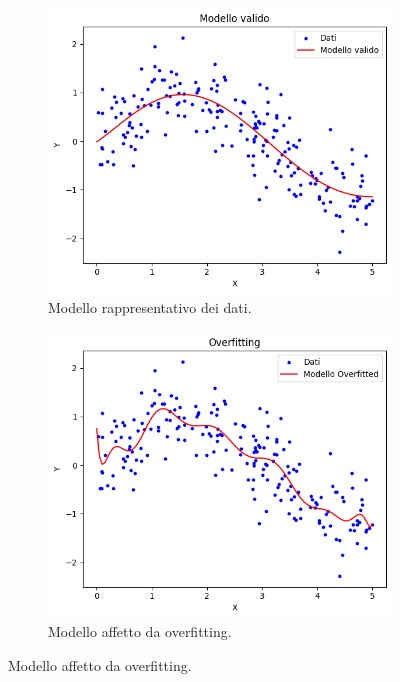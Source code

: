 \documentclass[12pt,a4paper,twoside,openright]{book}
\begin{document}
\begin{figure}
\centering
    \begin{subfigure}[b]{0.3\textwidth}
    \includegraphics[width=\textwidth]{images/valido.png}
    \caption{Modello rappresentativo dei dati.}
    \end{subfigure}
\quad
    \begin{subfigure}[b]{0.3\textwidth}
    \includegraphics[width=\textwidth]{images/overfitting.png}
    \caption{Modello affetto da overfitting.}
    \end{subfigure}

\end{figure}
\end{document}
